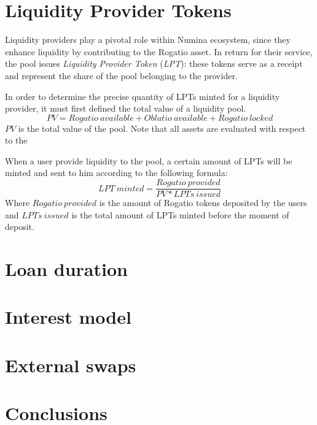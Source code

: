 \documentclass[12pt]{paper}
\begin{document}
\section{Liquidity Provider Tokens}
\label{sec:lptoken}
	Liquidity providers play a pivotal role within Numina ecosystem, since they enhance liquidity by contributing to the Rogatio asset. In return for their service, the pool issues \textit{Liquidity Provider Token} (\textit{LPT}): these tokens serve as a receipt and represent the share of the pool belonging to the provider.
	\par In order to determine the precise quantity of LPTs minted for a liquidity provider, it must first defined the total value of a liquidity pool.
	\begin{equation}
		PV = Rogatio\ available + Oblatio\ available + Rogatio\ locked
	\end{equation}
	$PV$ is the total value of the pool. Note that all assets are evaluated with respect to the
	\par When a user provide liquidity to the pool, a certain amount of LPTs will be minted and sent to him according to the following formula:
	\begin{equation}
		LPT\ minted = \frac{Rogatio\ provided}{PV * LPTs\ issued}
	\end{equation}
	Where $Rogatio\ provided$ is the amount of Rogatio tokens deposited by the users and $LPTs\ issued$ is the total amount of LPTs minted before the moment of deposit.

\section{Loan duration}
\label{sec:duration}

\section{Interest model}
\label{sec:interest}

\section{External swaps}

\section{Conclusions}
\label{sec:conclusions}
\end{document}
